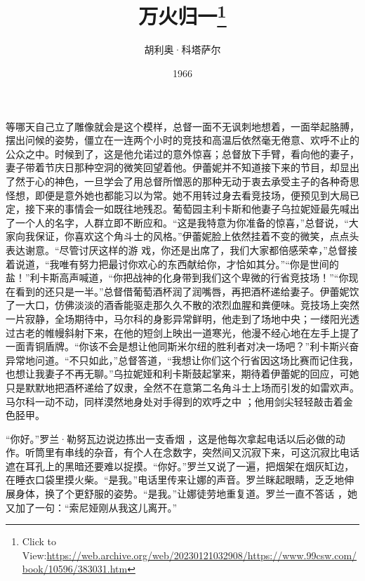 \documentclass{article}
\title{万火归一\footnote{Click to View:\url{https://web.archive.org/web/20230121032908/https://www.99csw.com/book/10596/383031.htm}}}
\author{胡利奥·科塔萨尔}
\date{1966}
\begin{document}

\maketitle


\Large

﻿等哪天自己立了雕像就会是这个模样，总督一面不无讽刺地想着，一面举起胳膊，摆出问候的姿势，僵立在一连两个小时的竞技和高温后依然毫无倦意、欢呼不止的公众之中。时候到了，这是他允诺过的意外惊喜；总督放下手臂，看向他的妻子，妻子带着节庆日那种空洞的微笑回望着他。伊蕾妮并不知道接下来的节目，却显出了然于心的神色，一旦学会了用总督所憎恶的那种无动于衷去承受主子的各种奇思怪想，即便是意外她也都能习以为常。她不用转过身去看竞技场，便预见到大局已定，接下来的事情会一如既往地残忍。葡萄园主利卡斯和他妻子乌拉妮娅最先喊出了一个人的名字，人群立即不断应和。“这是我特意为你准备的惊喜，”总督说，“大家向我保证，你喜欢这个角斗士的风格。”伊蕾妮脸上依然挂着不变的微笑，点点头表达谢意。“尽管讨厌这样的游
\newpage
戏，你还是出席了，我们大家都倍感荣幸，”总督接着说道，“我唯有努力把最讨你欢心的东西献给你，才恰如其分。”“你是世间的盐！”利卡斯高声喊道，“你把战神的化身带到我们这个卑微的行省竞技场！”“你现在看到的还只是一半。”总督借葡萄酒杯润了润嘴唇，再把酒杯递给妻子。伊蕾妮饮了一大口，仿佛淡淡的酒香能驱走那久久不散的浓烈血腥和粪便味。竞技场上突然一片寂静，全场期待中，马尔科的身影异常鲜明，他走到了场地中央；一缕阳光透过古老的帷幔斜射下来，在他的短剑上映出一道寒光，他漫不经心地在左手上提了一面青铜盾牌。“你该不会是想让他同斯米尔纽的胜利者对决一场吧？”利卡斯兴奋异常地问道。“不只如此，”总督答道，“我想让你们这个行省因这场比赛而记住我，也想让我妻子不再无聊。”乌拉妮娅和利卡斯鼓起掌来，期待着伊蕾妮的回应，可她只是默默地把酒杯递给了奴隶，全然不在意第二名角斗士上场而引发的如雷欢声。马尔科一动不动，同样漠然地身处对手得到的欢呼之中
；他用剑尖轻轻敲击着金色胫甲。 

“你好。”罗兰·勒努瓦边说边拣出一支香烟
\newpage
，这是他每次拿起电话以后必做的动作。听筒里有串线的杂音，有个人在念数字，突然间又沉寂下来，可这沉寂比电话遮在耳孔上的黑暗还要难以捉摸。“你好。”罗兰又说了一遍，把烟架在烟灰缸边，在睡衣口袋里摸火柴。“是我。”电话里传来让娜的声音。罗兰眯起眼睛，乏乏地伸展身体，换了个更舒服的姿势。“是我。”让娜徒劳地重复道。罗兰一直不答话
，她又加了一句：“索尼娅刚从我这儿离开。” 
\end{document}
